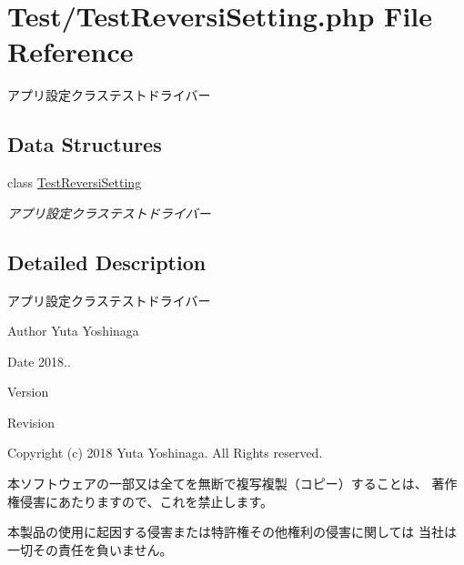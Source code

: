 \hypertarget{_test_reversi_setting_8php}{}\section{Test/\+Test\+Reversi\+Setting.php File Reference}
\label{_test_reversi_setting_8php}


アプリ設定クラステストドライバー  


\subsection*{Data Structures}
\begin{DoxyCompactItemize}
\item 
class \hyperlink{class_test_reversi_setting}{Test\+Reversi\+Setting}
\begin{DoxyCompactList}\small\item\em アプリ設定クラステストドライバー \end{DoxyCompactList}\end{DoxyCompactItemize}


\subsection{Detailed Description}
アプリ設定クラステストドライバー 

\begin{DoxyAuthor}{Author}
Yuta Yoshinaga 
\end{DoxyAuthor}
\begin{DoxyDate}{Date}
2018.. 
\end{DoxyDate}
\begin{DoxyParagraph}{Version}

\end{DoxyParagraph}
\begin{DoxyParagraph}{Revision}

\end{DoxyParagraph}


Copyright (c) 2018 Yuta Yoshinaga. All Rights reserved.


\begin{DoxyItemize}
\item 本ソフトウェアの一部又は全てを無断で複写複製（コピー）することは、 著作権侵害にあたりますので、これを禁止します。
\item 本製品の使用に起因する侵害または特許権その他権利の侵害に関しては 当社は一切その責任を負いません。 
\end{DoxyItemize}